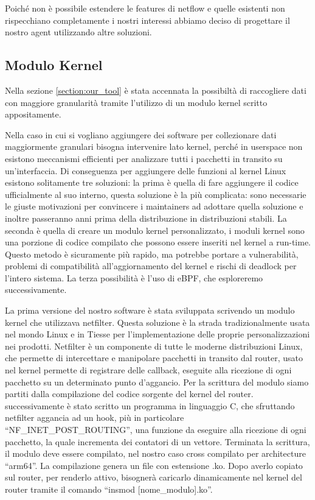 
Poiché non è possibile estendere le features di netflow e quelle esistenti non rispecchiano completamente i nostri interessi abbiamo deciso di progettare il nostro agent utilizzando altre soluzioni.

\subsection{Modulo Kernel}

Nella sezione \ref{section:our_tool} è stata accennata la possibiltà di raccogliere dati con maggiore granularità tramite l'utilizzo di un modulo kernel scritto appositamente.

Nella caso in cui si vogliano aggiungere dei software per collezionare dati maggiormente granulari bisogna intervenire lato kernel, perché in userspace non esistono meccanismi efficienti per analizzare tutti i pacchetti in transito su un'interfaccia. Di conseguenza per aggiungere delle funzioni al kernel Linux esistono solitamente tre soluzioni: la prima è quella di fare aggiungere il codice ufficialmente al suo interno, questa soluzione è la più complicata: sono necessarie le giuste motivazioni per convincere i maintainers ad adottare quella soluzione e inoltre passeranno anni prima della distribuzione in distribuzioni stabili. La seconda è quella di creare un modulo kernel personalizzato, i moduli kernel sono una porzione di codice compilato che possono essere inseriti nel kernel a run-time. Questo metodo è sicuramente più rapido, ma potrebbe portare a vulnerabilità, problemi di compatibilità all'aggiornamento del kernel e rischi di deadlock per l'intero sistema. La terza possibilità è l'uso di eBPF, che esploreremo successivamente.

La prima versione del nostro software è stata sviluppata scrivendo un modulo kernel che utilizzava netfilter. Questa soluzione è la strada tradizionalmente usata nel mondo Linux e in Tiesse per l'implementazione delle proprie personalizzazioni nei prodotti.
Netfilter è un componente di tutte le moderne distribuzioni Linux, che permette di intercettare e manipolare pacchetti in transito dal router, usato nel kernel permette di registrare delle callback, eseguite alla ricezione di ogni pacchetto su un determinato punto d'aggancio.
Per la scrittura del modulo siamo partiti dalla compilazione del codice sorgente del kernel del router. successivamente è stato scritto un programma in linguaggio C, che sfruttando netfilter aggancia ad un hook, più in particolare ``NF\_INET\_POST\_ROUTING'', una funzione da eseguire alla ricezione di ogni pacchetto, la quale incrementa dei contatori di un vettore.
Terminata la scrittura, il modulo deve essere compilato, nel nostro caso cross compilato per architecture ``arm64''. La compilazione genera un file con estensione .ko. Dopo averlo copiato sul router, per renderlo attivo, bisognerà caricarlo dinamicamente nel kernel del router tramite il comando ``insmod [nome\_modulo].ko''.

